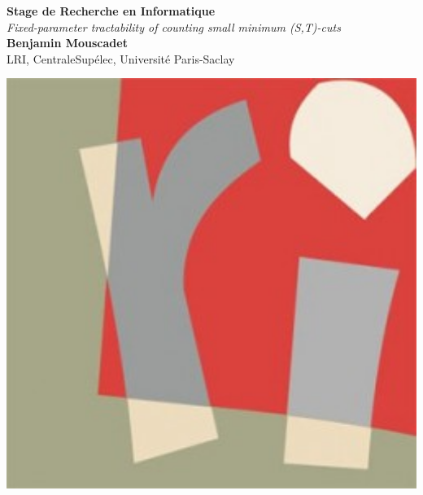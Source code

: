 \documentclass[a0,portrait]{a0poster}
\begin{document}


\begin{minipage}[b]{0.75\linewidth}
\veryHuge \color{NavyBlue} \textbf{Stage de Recherche en Informatique} \color{Black}\\ %
\Huge\textit{Fixed-parameter tractability of counting small minimum (S,T)-cuts }\\[2cm] %
\huge \textbf{Benjamin Mouscadet}\\[0.5cm] %
\huge LRI, CentraleSupélec, Université Paris-Saclay\\[0.4cm] %
\end{minipage}
%
\begin{minipage}[b]{0.25\linewidth}
\includegraphics[width=15cm]{logo_lri.jpg}\\
\end{minipage}
\end{document}
